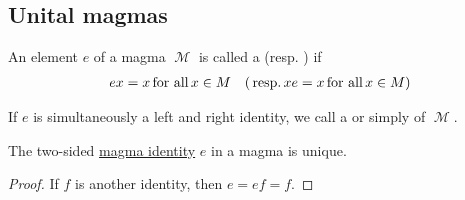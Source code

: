 \subsection{Unital magmas}\label{subsec:unital_magmas}

\begin{definition}\label{def:magma_identity}
  An element \( e \) of a magma \( \mscrM \) is called a  (resp. ) if
  \begin{align}\label{eq:def:magma_identity}
    ex = x \T{for all} x \in M
    &&
    (\T{resp.} xe = x \T{for all} x \in M)
  \end{align}

  If \( e \) is simultaneously a left and right identity, we call a  or simply  of \( \mscrM \).
\end{definition}

\begin{proposition}\label{thm:magma_identity_unique}
  The two-sided \hyperref[def:magma_identity]{magma identity} \( e \) in a magma is unique.
\end{proposition}
\begin{proof}
  If \( f \) is another identity, then \( e = ef = f \).
\end{proof}

